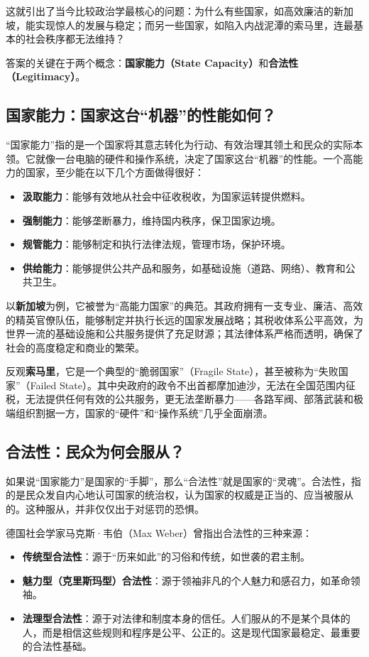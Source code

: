 \documentclass[a5paper, 11pt, openany]{ctexbook}
\begin{document}
这就引出了当今比较政治学最核心的问题：为什么有些国家，如高效廉洁的新加坡，能实现惊人的发展与稳定；而另一些国家，如陷入内战泥潭的索马里，连最基本的社会秩序都无法维持？

答案的关键在于两个概念：\textbf{国家能力（State Capacity）}和\textbf{合法性（Legitimacy）}。

\subsection{国家能力：国家这台“机器”的性能如何？}

“国家能力”指的是一个国家将其意志转化为行动、有效治理其领土和民众的实际本领。它就像一台电脑的硬件和操作系统，决定了国家这台“机器”的性能。一个高能力的国家，至少能在以下几个方面做得很好：
\begin{itemize}
    \item \textbf{汲取能力}：能够有效地从社会中征收税收，为国家运转提供燃料。
    \item \textbf{强制能力}：能够垄断暴力，维持国内秩序，保卫国家边境。
    \item \textbf{规管能力}：能够制定和执行法律法规，管理市场，保护环境。
    \item \textbf{供给能力}：能够提供公共产品和服务，如基础设施（道路、网络）、教育和公共卫生。
\end{itemize}

以\textbf{新加坡}为例，它被誉为“高能力国家”的典范。其政府拥有一支专业、廉洁、高效的精英官僚队伍，能够制定并执行长远的国家发展战略；其税收体系公平高效，为世界一流的基础设施和公共服务提供了充足财源；其法律体系严格而透明，确保了社会的高度稳定和商业的繁荣。

反观\textbf{索马里}，它是一个典型的“脆弱国家”（Fragile State），甚至被称为“失败国家”（Failed State）。其中央政府的政令不出首都摩加迪沙，无法在全国范围内征税，无法提供任何有效的公共服务，更无法垄断暴力——各路军阀、部落武装和极端组织割据一方，国家的“硬件”和“操作系统”几乎全面崩溃。

\subsection{合法性：民众为何会服从？}

如果说“国家能力”是国家的“手脚”，那么“合法性”就是国家的“灵魂”。合法性，指的是民众发自内心地认可国家的统治权，认为国家的权威是正当的、应当被服从的。这种服从，并非仅仅出于对惩罚的恐惧。

德国社会学家马克斯·韦伯（Max Weber）曾指出合法性的三种来源：
\begin{itemize}
    \item \textbf{传统型合法性}：源于“历来如此”的习俗和传统，如世袭的君主制。
    \item \textbf{魅力型（克里斯玛型）合法性}：源于领袖非凡的个人魅力和感召力，如革命领袖。
    \item \textbf{法理型合法性}：源于对法律和制度本身的信任。人们服从的不是某个具体的人，而是相信这些规则和程序是公平、公正的。这是现代国家最稳定、最重要的合法性基础。
\end{itemize}
\end{document}
